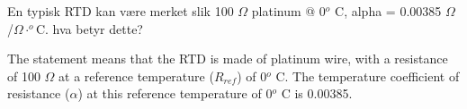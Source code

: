 

En typisk RTD kan være merket slik 100 $\Omega$ platinum @ 0$^{o}$ C, alpha = 0.00385 $\Omega$/$\Omega \cdot ^{o}$C.  hva betyr dette?







The statement means that the RTD is made of platinum wire, with a resistance of 100 $\Omega$ at a reference temperature ($R_{ref}$) of 0$^{o}$ C.  The temperature coefficient of resistance ($\alpha$) at this reference temperature of 0$^{o}$ C is 0.00385.











